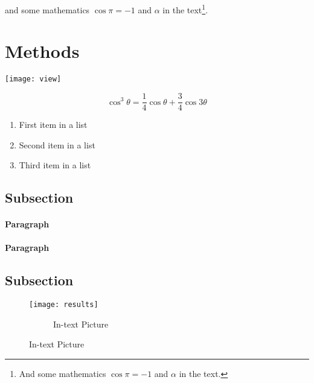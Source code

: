 
\lipsum[1-3] %
 and some mathematics $\cos\pi=-1$ and $\alpha$ in the text\footnote{And some mathematics $\cos\pi=-1$ and $\alpha$ in the text.}.



\section{Methods}

\begin{figure*}[ht]\centering %
	\texttt{[image: view]}
	\caption{Wide Picture}
	\label{fig:view}
\end{figure*}

\lipsum[4] %

\begin{equation}
	\cos^3 \theta =\frac{1}{4}\cos\theta+\frac{3}{4}\cos 3\theta
	\label{eq:refname2}
\end{equation}

\lipsum[5] %

\begin{enumerate}[noitemsep] %
	\item First item in a list
	\item Second item in a list
	\item Third item in a list
\end{enumerate}


\subsection{Subsection}

\lipsum[6] %


\paragraph{Paragraph} \lipsum[7] %


\paragraph{Paragraph} \lipsum[8] %


\subsection{Subsection}

\lipsum[9] %

\begin{figure}[ht]\centering
	\texttt{[image: results]}
	\begin{figure}
		\caption{In-text Picture}
	\end{figure}
	\label{fig:results}
\end{figure}
